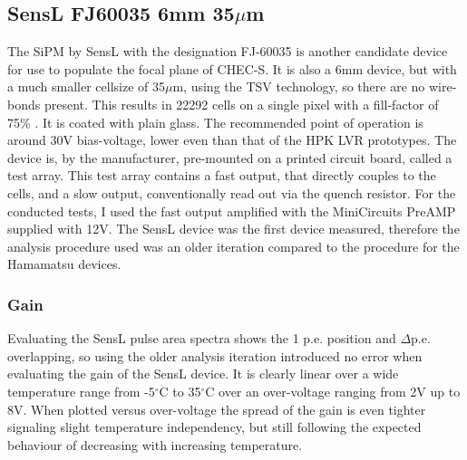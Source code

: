 \documentclass[12pt,article,type=msc,colorback,accentcolor=tud9c]{tudthesis}
\begin{document}
\subsection{SensL FJ60035 6mm 35$\mu$m}
The SiPM by SensL with the designation FJ-60035 is another candidate device for use to populate the focal plane of CHEC-S. It is also a 6mm device, but with a much smaller cellsize of 35$\mu$m, using the TSV technology, so there are no wire-bonds present. This results in 22292 cells on a single pixel with a fill-factor of 75\% . It is coated with plain glass. The recommended point of operation is around 30V bias-voltage, lower even than that of the HPK LVR prototypes. The device is, by the manufacturer, pre-mounted on a printed circuit board, called a test array. This test array contains a fast output, that directly couples to the cells, and a slow output, conventionally read out via the quench resistor. For the conducted tests, I used the fast output amplified with the MiniCircuits PreAMP supplied with 12V. The SensL device was the first device measured, therefore the analysis procedure used was an older iteration compared to the procedure for the Hamamatsu devices. 

\begin{figure}[h]
\begin{centering}
}
\caption[SensL FJ60035 SiPM and average pulse shape]{SensL Test Array and the average pulse shape at a bias-voltage of 29V}
\label{fig:SensL_Array_PS}
\end{centering}
\end{figure}


\newpage
\subsubsection{Gain}
\label{subsubsec:SensLGain}

Evaluating the SensL pulse area spectra shows the 1 p.e. position and $\Delta$p.e. overlapping, so using the older analysis iteration introduced no error when evaluating the gain of the SensL device. It is clearly linear over a wide temperature range from -5$^\circ$C to 35$^\circ$C over an over-voltage ranging from 2V up to 8V. When plotted versus over-voltage the spread of the gain is even tighter signaling slight temperature independency, but still following the expected behaviour of decreasing with increasing temperature.
\end{document}
